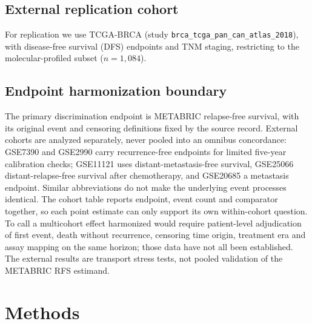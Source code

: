\documentclass[12pt,a4paper]{article}
\begin{document}
\subsection{External replication cohort}
For replication we use TCGA-BRCA (study
\texttt{brca\_tcga\_pan\_can\_atlas\_2018}), with disease-free survival (DFS)
endpoints and TNM staging, restricting to the molecular-profiled subset
($n = 1{,}084$).

\subsection{Endpoint harmonization boundary}
The primary discrimination endpoint is METABRIC relapse-free survival, with
its original event and censoring definitions fixed by the source record.
External cohorts are analyzed separately, never pooled into an omnibus
concordance: GSE7390 and GSE2990 carry recurrence-free endpoints for
limited five-year calibration checks; GSE11121 uses distant-metastasis-free
survival, GSE25066 distant-relapse-free survival after chemotherapy, and
GSE20685 a metastasis endpoint. Similar abbreviations do not make the
underlying event processes identical. The cohort table reports endpoint,
event count and comparator together, so each point estimate can only
support its own within-cohort question. To call a multicohort effect
harmonized would require patient-level adjudication of first event, death
without recurrence, censoring time origin, treatment era and assay mapping
on the same horizon; those data have not all been established. The external
results are transport stress tests, not pooled validation of the METABRIC
RFS estimand.

\section{Methods}
\end{document}

